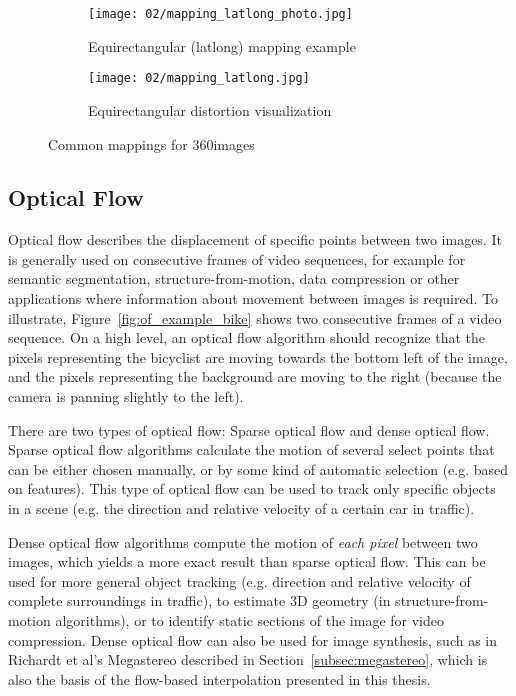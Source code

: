 \begin{figure}
    \hfill
    \begin{subfigure}[t]{0.5\textwidth} 
            \centering
            \texttt{[image: 02/mapping\_latlong\_photo.jpg]}
            \caption{Equirectangular (latlong) mapping example}
    \end{subfigure}%
    \hfill
    \begin{subfigure}[t]{0.5\textwidth}
            \centering
            \texttt{[image: 02/mapping\_latlong.jpg]}
            \caption{Equirectangular distortion visualization}\label{fig:latlong-intro}
    \end{subfigure}
    \hfill
    \caption{Common mappings for 360\degree images}\label{fig:common_mappings}
  \end{figure}
  
\subsection{Optical Flow} \label{subsec:optical_flow}
Optical flow describes the displacement of specific points between two images. It is generally used on consecutive frames of video sequences, for example for semantic segmentation, structure-from-motion, data compression or other applications where information about movement between images is required. To illustrate, Figure~\ref{fig:of_example_bike} shows two consecutive frames of a video sequence. On a high level, an optical flow algorithm should recognize that the pixels representing the bicyclist are moving towards the bottom left of the image, and the pixels representing the background are moving to the right (because the camera is panning slightly to the left).

There are two types of optical flow: Sparse optical flow and dense optical flow. Sparse optical flow algorithms calculate the motion of several select points that can be either chosen manually, or by some kind of automatic selection (e.g. based on features). This type of optical flow can be used to track only specific objects in a scene (e.g. the direction and relative velocity of a certain car in traffic).

Dense optical flow algorithms compute the motion of \emph{each pixel} between two images, which yields a more exact result than sparse optical flow. This can be used for more general object tracking (e.g. direction and relative velocity of complete surroundings in traffic), to estimate 3D geometry (in structure-from-motion algorithms), or to identify static sections of the image for video compression. Dense optical flow can also be used for image synthesis, such as in Richardt et al's Megastereo \cite{megastereo} described in Section~\ref{subsec:megastereo}, which is also the basis of the flow-based interpolation presented in this thesis.


